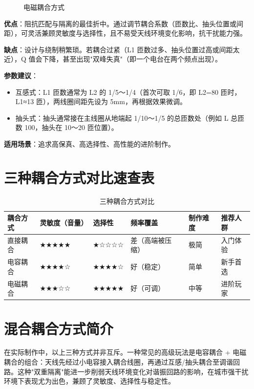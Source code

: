 \documentclass[12pt,UTF8]{ctexbook}
\begin{document}
\begin{figure}[H]
	\centering
	\caption{电磁耦合方式}
	\label{fig:electromagnetic-coupling}
\end{figure}

\textbf{优点}：阻抗匹配与隔离的最佳折中。通过调节耦合系数（匝数比、抽头位置或间距），可灵活兼顾灵敏度与选择性，且不易受天线环境变化影响，抗干扰能力强。

\textbf{缺点}：设计与绕制稍繁琐。若耦合过紧（L1 匝数过多、抽头位置过高或间距太近），Q 值会下降，甚至出现"双峰失真"（即一个电台在两个频点出现）。

\textbf{参数建议}：

\begin{itemize}[leftmargin=2cm]
	\item 互感式：L1 匝数通常为 L2 的 1/5～1/4（首次可取 1/6，即 L2=80 匝时，L1≈13 匝），两线圈间距先设为 5mm，再根据效果微调。
	\item 抽头式：抽头通常接在主线圈从地端起 1/10～1/5 的总匝数处（例如 L 总匝数 100，抽头在 10～20 匝位置）。
\end{itemize}

\textbf{适用场景}：追求高保真、高选择性、高性能的进阶制作。

\section{三种耦合方式对比速查表}

\begin{table}[H]
	\centering
	\begin{tabular}{|l|l|l|l|l|l|}
		\hline
		耦合方式 & 灵敏度（音量） & 选择性 & 频率覆盖 & 制作难度 & 推荐人群 \\
		\hline
		直接耦合 & ★★★★★ & ★☆☆☆☆ & 差（高端被压缩） & 极简 & 入门体验 \\
		\hline
		电容耦合 & ★★★★☆ & ★★★★☆ & 好（稳定） & 简单 & 新手首选 \\
		\hline
		电磁耦合 & ★★★☆☆ & ★★★★★ & 好（可调） & 中等 & 进阶玩家 \\
		\hline
	\end{tabular}
	\caption{三种耦合方式对比}
	\label{tab:coupling-comparison}
\end{table}

\section{混合耦合方式简介}

在实际制作中，以上三种方式并非互斥。一种常见的高级玩法是电容耦合 + 电磁耦合的组合：天线先经过小电容接入耦合线圈，再通过互感/抽头耦合至调谐回路。这种"双重隔离"能进一步削弱天线环境变化对谐振回路的影响，在城市强干扰环境下表现尤为出色，兼顾了灵敏度、选择性与稳定性。
\end{document}
